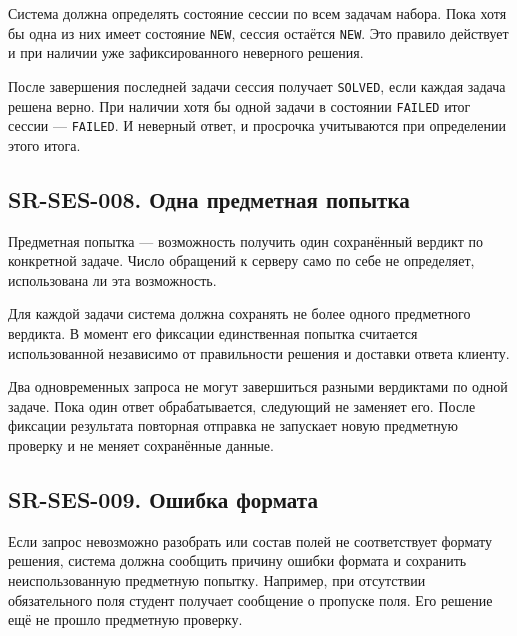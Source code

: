 \documentclass[12pt,a4paper]{article}
\begin{document}
\hypertarget{sr-ses-007-итог-сессии}{}

\hypertarget{sr-ses-007}{}

Система должна определять состояние сессии по всем задачам набора. Пока хотя бы одна из них имеет состояние \texttt{NEW}, сессия остаётся \texttt{NEW}. Это правило действует и при наличии уже зафиксированного неверного решения.

После завершения последней задачи сессия получает \texttt{SOLVED}, если каждая задача решена верно. При наличии хотя бы одной задачи в состоянии \texttt{FAILED} итог сессии --- \texttt{FAILED}. И неверный ответ, и просрочка учитываются при определении этого итога.

\subsection{SR-SES-008. Одна предметная попытка}\label{sr-ses-008-ux43eux434ux43dux430-ux43fux440ux435ux434ux43cux435ux442ux43dux430ux44f-ux43fux43eux43fux44bux442ux43aux430}

\hypertarget{sr-ses-008-одна-предметная-попытка}{}

\hypertarget{sr-ses-008}{}

Предметная попытка --- возможность получить один сохранённый вердикт по конкретной задаче. Число обращений к серверу само по себе не определяет, использована ли эта возможность.

Для каждой задачи система должна сохранять не более одного предметного вердикта. В момент его фиксации единственная попытка считается использованной независимо от правильности решения и доставки ответа клиенту.

Два одновременных запроса не могут завершиться разными вердиктами по одной задаче. Пока один ответ обрабатывается, следующий не заменяет его. После фиксации результата повторная отправка не запускает новую предметную проверку и не меняет сохранённые данные.

\subsection{SR-SES-009. Ошибка формата}\label{sr-ses-009-ux43eux448ux438ux431ux43aux430-ux444ux43eux440ux43cux430ux442ux430}

\hypertarget{sr-ses-009-ошибка-формата}{}

\hypertarget{sr-ses-009}{}

Если запрос невозможно разобрать или состав полей не соответствует формату решения, система должна сообщить причину ошибки формата и сохранить неиспользованную предметную попытку. Например, при отсутствии обязательного поля студент получает сообщение о пропуске поля. Его решение ещё не прошло предметную проверку.
\end{document}
